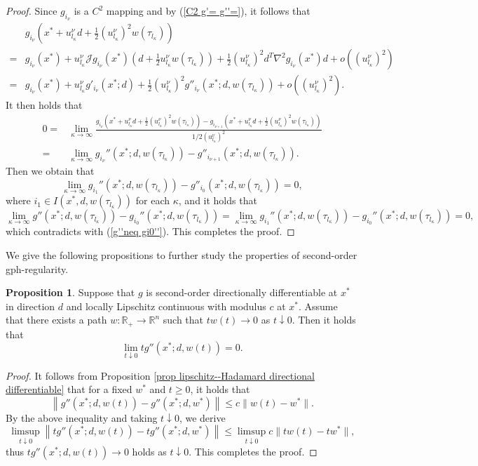 \documentclass[11pt]{article}
\theoremstyle{definition}
\newtheorem{proposition}[theorem]{Proposition}
\theoremstyle{remark}
\numberwithin{equation}{section}
\begin{document}
\begin{proof}
Since $g_{i_{\nu}}$ is a $C^2$ mapping and by (\ref{C2 g'= g''=}),      it follows that
\begin{align*}
  &g_{i_{\nu}}\left(x^*+u_{l_{\kappa}}^{\nu} d+\frac{1}{2}(u_{l_{\kappa}}^{\nu})^2 w(\tau_{l_{\kappa}})\right) \\
  = & g_{i_{\nu}}(x^*)+u_{l_{\kappa}}^{\nu}\mathcal{J}g_{i_{\nu}}(x^*)\left(d+\frac{1}{2}u_{l_{\kappa}}^{\nu} w(\tau_{l_{\kappa}})\right)+\frac{1}{2}(u_{l_{\kappa}}^{\nu})^2 d^T\nabla^2g_{i_{\nu}}(x^*)d+o((u_{l_{\kappa}}^{\nu})^2)\\
  =&g_{i_{\nu}}(x^*)+u_{l_{\kappa}}^{\nu} g'_{i_{\nu}}(x^*;d)+\frac{1}{2}(u_{l_{\kappa}}^{\nu})^2 g''_{i_{\nu}}(x^*;d,w(\tau_{l_{\kappa}}))+o((u_{l_{\kappa}}^{\nu})^2).
\end{align*}
It then holds   that
\begin{align*}
  0= &\lim_{\kappa\to \infty} \frac{g_{i_{\nu}}\left(x^*+u_{l_{\kappa}}^{\nu} d+\frac{1}{2}(u_{l_{\kappa}}^{\nu})^2 w(\tau_{l_{\kappa}})\right)-g_{i_{{\nu}+1}}\left(x^*+u_{l_{\kappa}}^{\nu} d+\frac{1}{2}(u_{l_{\kappa}}^{\nu})^2 w(\tau_{l_{\kappa}})\right)}{1/2(u_{l_{\kappa}}^{\nu})^2}\\
  =&\lim_{\kappa\to\infty}g_{i_{\nu}}''(x^*;d,w(\tau_{l_{\kappa}}))-g''_{i_{{\nu}+1}}(x^*;d,w(\tau_{l_{\kappa}})).
\end{align*}
 Then we obtain that
$$\lim_{\kappa\to\infty}g_{i_1}''(x^*;d,w(\tau_{l_{\kappa}}))-g''_{i_0}(x^*;d,w(\tau_{l_{\kappa}}))=0,$$
 where $i_1\in I(x^*,d,w(\tau_{l_{\kappa}}))$  for each $\kappa$, and it holds that
$$ \lim\limits_{\kappa\to \infty} g''(x^*;d,w(\tau_{l_{\kappa}}))-g_{i_0}''(x^*;d,w(\tau_{l_{\kappa}}))=
    \lim\limits_{\kappa\to \infty} g_{i_1}''(x^*;d,w(\tau_{l_{\kappa}}))-g_{i_0}''(x^*;d,w(\tau_{l_{\kappa}}))=0,
$$
which contradicts with (\ref{g''neq gi0''}).
 This completes the proof.
 \end{proof}

We give the following propositions to further study the properties of second-order gph-regularity.
\begin{proposition}\label{prop tg''(x^*;d,w(t)) to 0}
   Suppose that $g$ is second-order directionally differentiable  at $x^*$ in direction $d$ and locally Lipschitz continuous  with modulus $c$ at
   $x^*$. Assume that there exists a path $w:\mathbb{R}_{+}\to \mathbb{R}^n$ such that $tw(t)\to 0$ as
   $t\downarrow 0$. Then it holds that
$$\lim_{t\downarrow 0} tg''(x^*;d,w(t))= 0.$$
\end{proposition}
\begin{proof}
  It follows from Proposition \ref{prop lipschitz--Hadamard directional differentiable} that for a fixed
  $w^*$ and $t\ge0$, it holds that
  $$ \left\|g''(x^*;d,w(t))-g''(x^*;d,w^*)\right\|\le  c\|w(t)-w^*\|.
  $$
By the above inequality and taking $t\downarrow 0$, we derive
 $$
    \limsup_{t\downarrow 0}\left\|tg''(x^*;d,w(t))-tg''(x^*;d,w^*)\right\|\le \limsup_{t\downarrow 0} c\|t
    w(t)-tw^*\|,
$$
 thus    $tg''(x^*;d,w(t))\to 0$ holds as $t\downarrow 0$. This completes the proof.
\end{proof}
\end{document}
